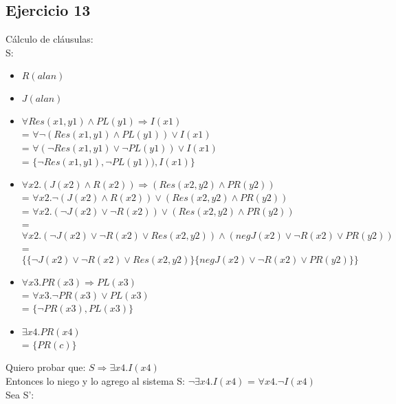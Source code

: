 \documentclass[10pt,a4paper]{article}
\begin{document}
\subsection{Ejercicio 13}
Cálculo de cláusulas: \\
S:
\begin{itemize}
    \item $R(alan)$
    \item $J(alan)$
    \item $\forall Res(x1,y1) \wedge PL(y1) \Rightarrow I(x1)$ \\
    = $\forall \neg (Res(x1,y1) \wedge PL(y1)) \vee I(x1)$ \\
    = $\forall (\neg Res(x1,y1) \vee \neg PL(y1)) \vee I(x1)$ \\
    = $\{ \neg Res(x1,y1), \neg PL(y1)), I(x1) \}$
    \item $\forall x2. (J(x2) \wedge R(x2)) \Rightarrow (Res(x2,y2) \wedge PR(y2))$ \\
    = $\forall x2. \neg (J(x2) \wedge R(x2)) \vee (Res(x2,y2) \wedge PR(y2))$ \\
    = $\forall x2. (\neg J(x2) \vee \neg R(x2)) \vee (Res(x2,y2) \wedge PR(y2))$ \\
    = $\forall x2. (\neg J(x2) \vee \neg R(x2) \vee Res(x2,y2)) \wedge (neg J(x2) \vee \neg R(x2) \vee PR(y2))$ \\
    = $\{\{\neg J(x2) \vee \neg R(x2) \vee Res(x2,y2)\}\{neg J(x2) \vee \neg R(x2) \vee PR(y2)\}\}$
    \item $\forall x3. PR(x3) \Rightarrow PL(x3)$ \\
    = $\forall x3. \neg PR(x3) \vee PL(x3)$  \\
    = $\{\neg PR(x3), PL(x3)\}$
    \item $\exists x4. PR(x4)$ \\
    = $\{PR(c)\}$
\end{itemize}
Quiero probar que: $S \Rightarrow \exists x4. I(x4)$ \\
Entonces lo niego y lo agrego al sistema S: $\neg \exists x4. I(x4)$ = $\forall x4. \neg I(x4)$ \\
Sea S':
\end{document}
